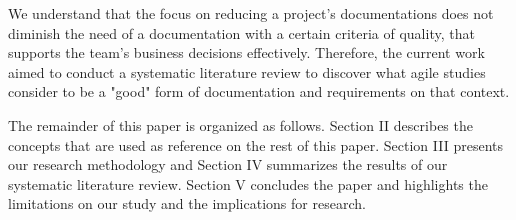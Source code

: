 We understand that the focus on reducing a project's documentations does not diminish the need of a documentation with a certain criteria of quality, that supports the team's business decisions effectively. Therefore, the current work aimed to conduct a systematic literature review to discover what agile studies consider to be a "good" form of documentation and requirements on that context.

The remainder of this paper is organized as follows. Section II describes the concepts that are used as reference on the rest of this paper. Section III presents our research methodology and Section IV summarizes the results of our systematic literature review. Section V concludes the paper and highlights the limitations on our study and the implications for research.
